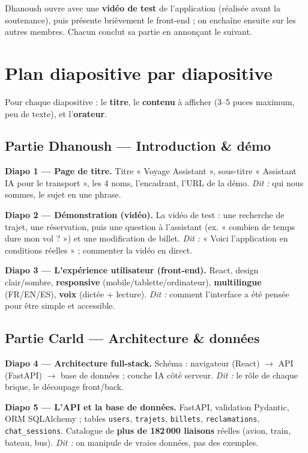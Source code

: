 \documentclass[11pt,a4paper]{article}
\newcommand{\code}[1]{\texttt{\small #1}}
\begin{document}
Dhanoush ouvre avec une \textbf{vidéo de test} de l'application (réalisée avant la
soutenance), puis présente brièvement le front-end ; on enchaîne ensuite sur les autres
membres. Chacun conclut sa partie en annonçant le suivant.

\section{Plan diapositive par diapositive}

Pour chaque diapositive : le \textbf{titre}, le \textbf{contenu} à afficher (3--5 puces
maximum, peu de texte), et l'\textbf{orateur}.

\subsection*{Partie Dhanoush --- Introduction \& démo}

\textbf{Diapo 1 --- Page de titre.}
Titre « Voyage Assistant », sous-titre « Assistant IA pour le transport », les 4 noms,
l'encadrant, l'URL de la démo. \emph{Dit :} qui nous sommes, le sujet en une phrase.

\textbf{Diapo 2 --- Démonstration (vidéo).}
La vidéo de test : une recherche de trajet, une réservation, puis une question à
l'assistant (ex. « combien de temps dure mon vol ? ») et une modification de billet.
\emph{Dit :} « Voici l'application en conditions réelles » ; commenter la vidéo en direct.

\textbf{Diapo 3 --- L'expérience utilisateur (front-end).}
React, design clair/sombre, \textbf{responsive} (mobile/tablette/ordinateur),
\textbf{multilingue} (FR/EN/ES), \textbf{voix} (dictée + lecture). \emph{Dit :} comment
l'interface a été pensée pour être simple et accessible.

\subsection*{Partie Carld --- Architecture \& données}

\textbf{Diapo 4 --- Architecture full-stack.}
Schéma : navigateur (React) $\rightarrow$ API (FastAPI) $\rightarrow$ base de données ;
couche IA côté serveur. \emph{Dit :} le rôle de chaque brique, le découpage front/back.

\textbf{Diapo 5 --- L'API et la base de données.}
FastAPI, validation Pydantic, ORM SQLAlchemy ; tables \code{users}, \code{trajets},
\code{billets}, \code{reclamations}, \code{chat\_sessions}. Catalogue de
\textbf{plus de 182\,000 liaisons} réelles (avion, train, bateau, bus). \emph{Dit :} on
manipule de vraies données, pas des exemples.
\end{document}

